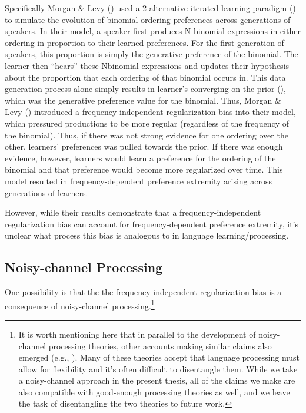\documentclass[
  12pt,
]{scrartcl}
\begin{document}
Specifically Morgan \& Levy
()
used a 2-alternative iterated learning paradigm
() to simulate the evolution of binomial ordering
preferences across generations of speakers. In their model, a speaker
first produces N binomial expressions in either ordering in proportion
to their learned preferences. For the first generation of speakers, this
proportion is simply the generative preference of the binomial. The
learner then ``hears'' these Nbinomial expressions and updates their
hypothesis about the proportion that each ordering of that binomial
occurs in. This data generation process alone simply results in
learner's converging on the prior
(), which was the generative preference value for the
binomial. Thus, Morgan \& Levy
()
introduced a frequency-independent regularization bias into their model,
which pressured productions to be more regular (regardless of the
frequency of the binomial). Thus, if there was not strong evidence for
one ordering over the other, learners' preferences was pulled towards
the prior. If there was enough evidence, however, learners would learn a
preference for the ordering of the binomial and that preference would
become more regularized over time. This model resulted in
frequency-dependent preference extremity arising across generations of
learners.

However, while their results demonstrate that a frequency-independent
regularization bias can account for frequency-dependent preference
extremity, it's unclear what process this bias is analogous to in
language learning/processing.

\subsection{Noisy-channel Processing}\label{noisy-channel-processing}

One possibility is that the the frequency-independent regularization
bias is a consequence of noisy-channel processing.\footnote{It is worth
  mentioning here that in parallel to the development of noisy-channel
  processing theories, other accounts making similar claims also emerged
  (e.g., ). Many of these theories accept that language processing
  must allow for flexibility and it's often difficult to disentangle
  them. While we take a noisy-channel approach in the present thesis,
  all of the claims we make are also compatible with good-enough
  processing theories as well, and we leave the task of disentangling
  the two theories to future work.}
\end{document}
